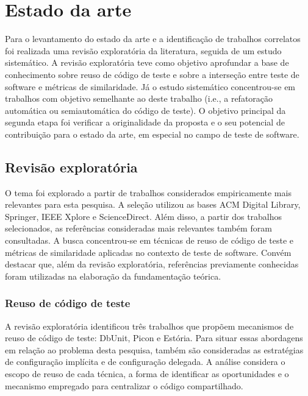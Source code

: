 \chapter{Estado da arte}
\label{chapter:state-of-the-art}

Para o levantamento do estado da arte e a identificação de trabalhos correlatos foi realizada uma revisão exploratória da literatura, seguida de um estudo sistemático. A revisão exploratória teve como objetivo aprofundar a base de conhecimento sobre reuso de código de teste e sobre a interseção entre teste de software e métricas de similaridade. Já o estudo sistemático concentrou-se em trabalhos com objetivo semelhante ao deste trabalho (i.e., a refatoração automática ou semiautomática do código de teste). O objetivo principal da segunda etapa foi verificar a originalidade da proposta e o seu potencial de contribuição para o estado da arte, em especial no campo de teste de software.

\section{Revisão exploratória}

O tema foi explorado a partir de trabalhos considerados empiricamente mais relevantes para esta pesquisa. A seleção utilizou as bases ACM Digital Library, Springer, IEEE Xplore e ScienceDirect. Além disso, a partir dos trabalhos selecionados, as referências consideradas mais relevantes também foram consultadas. A busca concentrou-se em técnicas de reuso de código de teste e métricas de similaridade aplicadas no contexto de teste de software. Convém destacar que, além da revisão exploratória, referências previamente conhecidas foram utilizadas na elaboração da fundamentação teórica.

\subsection{Reuso de código de teste}

A revisão exploratória identificou três trabalhos que propõem mecanismos de reuso de código de teste: DbUnit, Picon e Estória. Para situar essas abordagens em relação ao problema desta pesquisa, também são consideradas as estratégias de configuração implícita e de configuração delegada. A análise considera o escopo de reuso de cada técnica, a forma de identificar as oportunidades e o mecanismo empregado para centralizar o código compartilhado.

